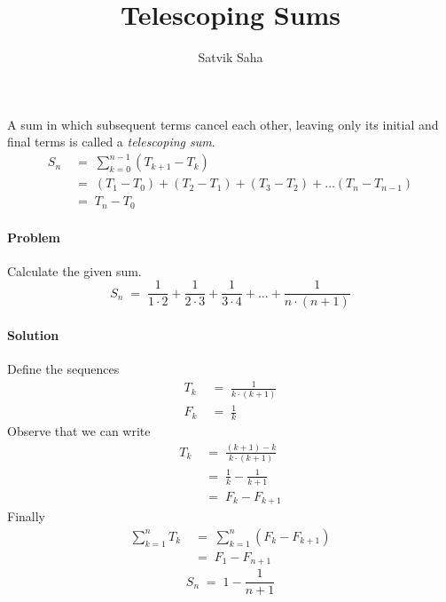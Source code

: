 \documentclass[a4paper, 11pt, reqno]{article}
\title{Telescoping Sums}
\author{Satvik Saha}
\date{}
\newcounter{prob}
\def\problem{\stepcounter{prob}\paragraph{Problem \arabic{prob}}}
\def\solution{\paragraph{Solution}}
\begin{document}
	\maketitle
	
	A sum in which subsequent terms cancel each other, leaving only its initial and final terms is called a
	\textit{telescoping sum}.
	\begin{align*}
		S_n  \; &= \; \sum_{k=0}^{n-1} (T_{k+1} - T_{k})	\\
		     \; &= \; (T_1 - T_0) + (T_2 - T_1) + (T_3 - T_2) + \dots (T_{n} - T_{n-1})	\\
		     \; &= \; T_{n} - T_{0}
	\end{align*}
	
	\problem
	Calculate the given sum.
	\begin{equation*}
		S_n  \; = \;  \frac{1}{1\cdot 2} + \frac{1}{2\cdot 3} + \frac{1}{3\cdot 4} + \dots + \frac{1}{n\cdot (n+1)} 
	\end{equation*}
	\solution
	Define the sequences
	\begin{align*}
		T_k  \; &= \; \frac{1}{k\cdot (k + 1)} \\
		F_k  \; &= \; \frac{1}{k}
	\end{align*}
	Observe that we can write
	\begin{align*}
		T_k 	\; &= \; \frac{(k + 1) - k}{k\cdot (k + 1)} \\
			\; &= \; \frac{1}{k} - \frac{1}{k + 1} \\
			\; &= \; F_k - F_{k + 1}
	\end{align*}
	Finally
	\begin{align*}
		\sum_{k=1}^{n} T_k 	\; &= \; \sum_{k=1}^{n} (F_k - F_{k+1}) \\
					\; &= \; F_1 - F_{n + 1}
	\end{align*}
	\begin{equation*}
		\boxed{S_n \; = \;  1 - \frac{1}{n + 1}}
	\end{equation*}
	
\end{document}
